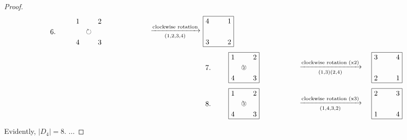 \documentclass[12pt,reqno]{article}
\theoremstyle{plain}
\theoremstyle{definition}
\begin{document}
\begin{proof}
\begin{align*}
\begin{tikzpicture}
            \node at (-1, 0.75) {6.};
            \node[below right] at (0,1.5) {1};
            \node[below left] at (1.5,1.5) {2};
            \node[above left] at (1.5,0) {3};
            \node[above right] at (0,0) {4};
            \node at (0.75,0.75) {\(\circlearrowright\)};
            \node at (5,0.75) {\(\xrightarrow[(1,2,3,4)]{\text{clockwise rotation}}\)};
        \end{tikzpicture}
        &\begin{tikzpicture}
            \draw (0,0) -- (0,1.5) -- (1.5,1.5) -- (1.5,0) -- (0,0);
            \node[below right] at (0,1.5) {4};
            \node[below left] at (1.5,1.5) {1};
            \node[above left] at (1.5,0) {2};
            \node[above right] at (0,0) {3};
        \end{tikzpicture}
        \\
        &\begin{tikzpicture}
            \draw (0,0) -- (0,1.5) -- (1.5,1.5) -- (1.5,0) -- (0,0);
            \node at (-1, 0.75) {7.};
            \node[below right] at (0,1.5) {1};
            \node[below left] at (1.5,1.5) {2};
            \node[above left] at (1.5,0) {3};
            \node[above right] at (0,0) {4};
            \node at (0.75,0.75) {\(\circlearrowright\)};
            \node at (0.75,0.75) {\tiny{2}};
            \node at (5,0.75) {\(\xrightarrow[(1,3)(2,4)]{\text{clockwise rotation (x2)}}\)};
        \end{tikzpicture}
        &\begin{tikzpicture}
            \draw (0,0) -- (0,1.5) -- (1.5,1.5) -- (1.5,0) -- (0,0);
            \node[below right] at (0,1.5) {3};
            \node[below left] at (1.5,1.5) {4};
            \node[above left] at (1.5,0) {1};
            \node[above right] at (0,0) {2};
        \end{tikzpicture}
        \\
        &\begin{tikzpicture}
            \draw (0,0) -- (0,1.5) -- (1.5,1.5) -- (1.5,0) -- (0,0);
            \node at (-1, 0.75) {8.};
            \node[below right] at (0,1.5) {1};
            \node[below left] at (1.5,1.5) {2};
            \node[above left] at (1.5,0) {3};
            \node[above right] at (0,0) {4};
            \node at (0.75,0.75) {\(\circlearrowright\)};
            \node at (0.75,0.75) {\tiny{3}};
            \node at (5,0.75) {\(\xrightarrow[(1,4,3,2)]{\text{clockwise rotation (x3)}}\)};
        \end{tikzpicture}
        &\begin{tikzpicture}
            \draw (0,0) -- (0,1.5) -- (1.5,1.5) -- (1.5,0) -- (0,0);
            \node[below right] at (0,1.5) {2};
            \node[below left] at (1.5,1.5) {3};
            \node[above left] at (1.5,0) {4};
            \node[above right] at (0,0) {1};
        \end{tikzpicture}
    \end{align*}
    Evidently, \(|D_4|=8\). ...
\end{proof}
\end{document}
